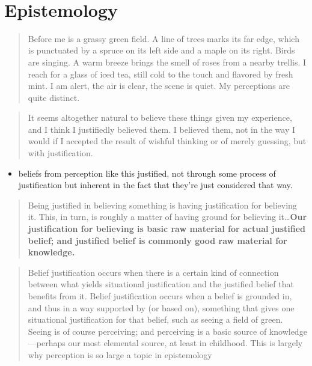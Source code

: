 \documentclass[11pt]{article}
\begin{document}
\thispagestyle{empty}
\bigskip \
\vspace{0.1cm}

\begin{center}
{\fontsize{36}{36} \selectfont \bf \sffamily }
\vskip 24pt
{\fontsize{18}{18} \selectfont \rmfamily } 
\vskip 24pt
\end{center}

\newpage
\microtoc
\newpage

\hypertarget{epistemology}{%
\section{Epistemology}\label{epistemology}}

\begin{quote}
Before me is a grassy green field. A line of trees marks its far edge,
which is punctuated by a spruce on its left side and a maple on its
right. Birds are singing. A warm breeze brings the smell of roses from a
nearby trellis. I reach for a glass of iced tea, still cold to the touch
and flavored by fresh mint. I am alert, the air is clear, the scene is
quiet. My perceptions are quite distinct.
\end{quote}

\begin{quote}
It seems altogether natural to believe these things given my experience,
and I think I justifiedly believed them. I believed them, not in the way
I would if I accepted the result of wishful thinking or of merely
guessing, but with justification.
\end{quote}

\begin{itemize}
\tightlist
\item
  beliefs from perception like this justified, not through some process
  of justification but inherent in the fact that they're just considered
  that way.
\end{itemize}

\begin{quote}
Being justified in believing something is having justification for
believing it. This, in turn, is roughly a matter of having ground for
believing it\ldots{}\textbf{Our justification for believing is basic raw
material for actual justified belief; and justified belief is commonly
good raw material for knowledge.}
\end{quote}

\begin{quote}
Belief justification occurs when there is a certain kind of connection
between what yields situational justification and the justified belief
that benefits from it. Belief justification occurs when a belief is
grounded in, and thus in a way supported by (or based on), something
that gives one situational justification for that belief, such as seeing
a field of green. Seeing is of course perceiving; and perceiving is a
basic source of knowledge---perhaps our most elemental source, at least
in childhood. This is largely why perception is so large a topic in
epistemology
\end{quote}
\end{document}

